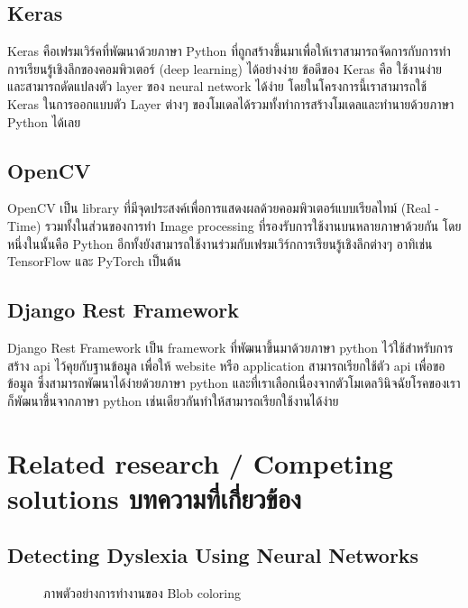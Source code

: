 \documentclass[12pt,oneside,openright,a4paper]{cpe-thai-project}
\begin{document}
\subsection{Keras}
Keras คือเฟรมเวิร์คที่พัฒนาด้วยภาษา Python ที่ถูกสร้างขึ้นมาเพื่อให้เราสามารถจัดการกับการทำ การเรียนรู้เชิงลึกของคอมพิวเตอร์ (deep learning) 
ได้อย่างง่าย ข้อดีของ Keras คือ ใช้งานง่าย และสามารถดัดแปลงตัว layer ของ neural network ได้ง่าย  โดยในโครงการนี้เราสามารถใช้ Keras 
ในการออกแบบตัว Layer ต่างๆ ของโมเดลได้รวมทั้งทำการสร้างโมเดลและทำนายด้วยภาษา Python ได้เลย

\subsection{OpenCV}
OpenCV เป็น library ที่มีจุดประสงค์เพื่อการแสดงผลด้วยคอมพิวเตอร์แบบเรียลไทม์  (Real - Time) รวมทั้งในส่วนของการทำ Image processing ที่รองรับการใช้งานบนหลายภาษาด้วยกัน
 โดยหนึ่งในนั้นคือ Python อีกทั้งยังสามารถใช้งานร่วมกับเฟรมเวิร์กการเรียนรู้เชิงลึกต่างๆ อาทิเช่น TensorFlow และ PyTorch  เป็นต้น 

\subsection{Django Rest Framework}
Django Rest Framework เป็น framework ที่พัฒนาขึ้นมาด้วยภาษา python ไว้ใช้สำหรับการสร้าง api ไว้คุยกับฐานข้อมูล  
เพื่อให้ website หรือ application สามารถเรียกใช้ตัว api เพื่อขอข้อมูล  ซึ่งสามารถพัฒนาได้ง่ายด้วยภาษา python
และที่เราเลือกเนื่องจากตัวโมเดลวินิจฉัยโรคของเราก็พัฒนาขึ้นจากภาษา python เช่นเดียวกันทำให้สามารถเรียกใช้งานได้ง่าย

\section{Related research / Competing solutions บทความที่เกี่ยวข้อง}

\subsection{Detecting Dyslexia Using Neural Networks}
\begin{figure}[!ht]\centering
  \setlength{\fboxrule}{0.2mm} %
  \setlength{\fboxsep}{1cm}
  \caption{ภาพตัวอย่างการทำงานของ Blob coloring}\label{fig:blob}
\end{figure}
\end{document}
